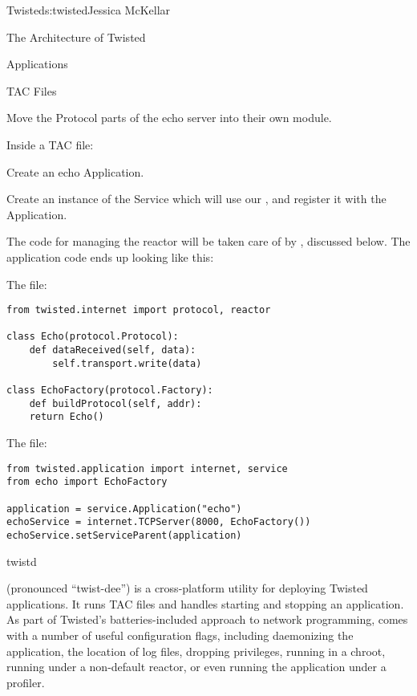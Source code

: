 \begin{aosachapter}{Twisted}{s:twisted}{Jessica McKellar}
\begin{aosasect1}{The Architecture of Twisted}
\begin{aosasect2}{Applications}
\begin{aosasect3}{TAC Files}
\begin{aosaenumerate}
  \item Move the Protocol parts of the echo server into their own
    module.
  \item Inside a TAC file:

  \begin{aosaenumerate2}
    \item Create an echo Application.
    \item Create an instance of the  Service which will use our
    , and register it with the Application.
  \end{aosaenumerate2}
\end{aosaenumerate}

The code for managing the reactor will be taken care of by
, discussed below. The application code ends up looking like
this:

The  file:

\begin{verbatim}
from twisted.internet import protocol, reactor

class Echo(protocol.Protocol):
    def dataReceived(self, data):
        self.transport.write(data)

class EchoFactory(protocol.Factory):
    def buildProtocol(self, addr):
    return Echo()
\end{verbatim}

\noindent The  file:

\begin{verbatim}
from twisted.application import internet, service
from echo import EchoFactory

application = service.Application("echo")
echoService = internet.TCPServer(8000, EchoFactory())
echoService.setServiceParent(application)
\end{verbatim}

\end{aosasect3}

\begin{aosasect3}{twistd}

 (pronounced ``twist-dee'') is a cross-platform utility for
deploying Twisted applications. It runs TAC files and handles starting and
stopping an application. As part of Twisted's batteries-included approach to
network programming,  comes with a number of useful configuration flags,
including daemonizing the application, the location of log files, dropping
privileges, running in a chroot, running under a non-default reactor, or even
running the application under a profiler.


\end{aosasect3}
\end{aosasect2}
\end{aosasect1}
\end{aosachapter}
